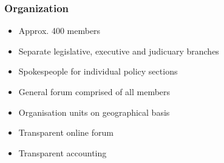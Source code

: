 \begin{frame}
	\frametitle{Organization}
	\begin{itemize}
		\item Approx. 400 members
		\item Separate legislative, executive and judicuary branches
		\item Spokespeople for individual policy sections
		\item General forum comprised of all members
		\item Organisation units on geographical basis
		\item Transparent online forum
		\item Transparent accounting
	\end{itemize}
	
	

\end{frame}
